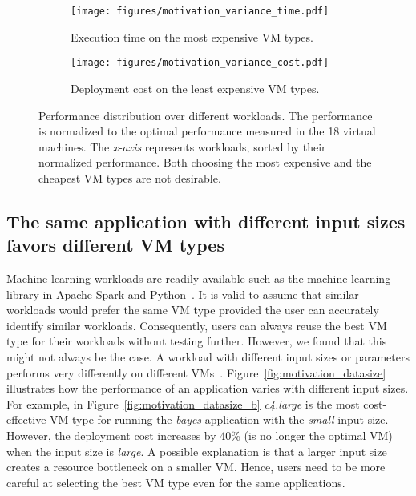 


\begin{figure}
\centering
\begin{subfigure}[b]{0.45\textwidth}
    \texttt{[image: figures/motivation\_variance\_time.pdf]}
    \caption{Execution time on the most expensive VM types.}
    \label{fig:motivation_variance_time}
\end{subfigure}
\hfill
\begin{subfigure}[b]{0.45\textwidth}
    \texttt{[image: figures/motivation\_variance\_cost.pdf]}
    \caption{Deployment cost on the least expensive VM types.}
    \label{fig:motivation_variance_cost}
\end{subfigure}
\caption{Performance distribution over different workloads. The performance is normalized to the optimal performance measured in the 18 virtual machines. The \emph{x-axis} represents workloads, sorted by their normalized performance.  Both choosing the most expensive and the cheapest VM types are not desirable.}
\label{fig:motivation_variance}
\end{figure}





\subsection*{The same application with different input sizes favors different VM types}
Machine learning workloads are readily available
such as the machine learning library in Apache Spark and Python~\cite{scikit-learn}.
It is valid to assume that similar workloads would prefer the same VM type provided the user can accurately identify similar workloads.
Consequently, users can always reuse the best VM type for their workloads without testing further.
However, we found that this might not always be the case.
A workload with different input sizes or parameters performs very differently on different VMs~\cite{Venkataraman2016}.
Figure~\ref{fig:motivation_datasize} illustrates how the performance of an application varies with different input sizes.
For example, in Figure~\ref{fig:motivation_datasize_b}
\emph{c4.large} is the most cost-effective VM type for running the \textit{bayes} application with the \emph{small} input size.
However, the deployment cost increases by 40\% (is no longer the optimal VM) when the input size is \emph{large}.
A possible explanation is that a larger input size creates
a resource bottleneck on a smaller VM.
Hence, users need to be more careful
at selecting the best VM type even for the same applications.



